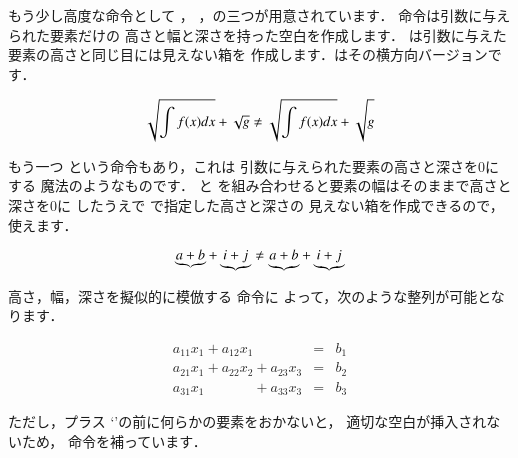 もう少し高度な命令として ，
，の三つが用意されています．
命令は引数に与えられた要素だけの
高さと幅と深さを持った空白を作成します．
は引数に与えた要素の高さと同じ目には見えない箱を
作成します．はその横方向バージョンです．
\begin{InOut}
\[ \sqrt{\int f(x)dx}+\sqrt{g}
   \neq \sqrt{\int f(x)dx}+\sqrt
   {\vphantom{\int f(x)dx} g} \]
\end{InOut}
もう一つ という命令もあり，これは
引数に与えられた要素の高さと深さを0にする
魔法のようなものです． と 
を組み合わせると要素の幅はそのままで高さと深さを0に
したうえで で指定した高さと深さの
見えない箱を作成できるので，
使えます．%
\begin{InOut}
\[\underbrace{a+b}+\underbrace{i+j}
 \neq \underbrace{\smash{a+b}
 \vphantom{i+j}} + \underbrace{i+j}\]
\end{InOut}

\begin{Exe}
高さ，幅，深さを擬似的に模倣する  命令に
よって，次のような整列が可能となります．
\begin{InOut}
\newcommand\PN[1]{\phantom{\mbox{}#1}}
\begin{eqnarray*}
a_{11}x_1  +a_{12}x_1 \PN{+a_{23}x_3}
  &=& b_1\\
a_{21}x_1  +a_{22}x_2 + a_{23}x_3
  &=& b_2\\
a_{31}x_1 \PN{+a_{22}x_2}+ a_{33}x_3
  &=& b_3
\end{eqnarray*}
\end{InOut} 
ただし，プラス `\str{+}'の前に何らかの要素をおかないと，
適切な空白が挿入されないため， 命令を補っています．
\end{Exe}

